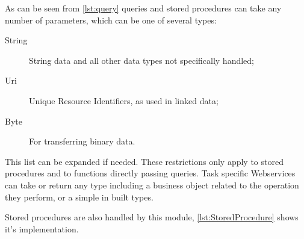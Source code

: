 As can be seen from \autoref{lst:query} queries and stored procedures can take any number of parameters, which can be one of several types:

\begin{description}
    \item[String] String data and all other data types not specifically handled;
    \item[Uri]  Unique Resource Identifiers, as used in linked data;
    \item[Byte] For transferring binary data.
\end{description}

This list can be expanded if needed. These restrictions only apply to stored procedures and to functions directly passing queries. Task specific Webservices can take or return any type including a business object related to the operation they perform, or a simple in built types.

Stored procedures are also handled by this module, \autoref{lst:StoredProcedure} shows it's implementation.

